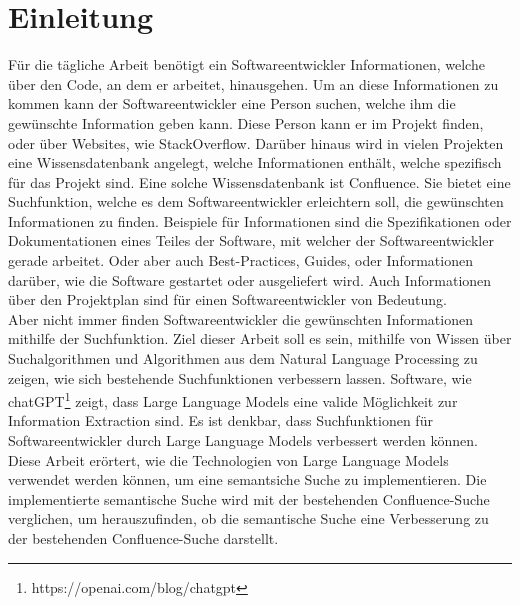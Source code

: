 \chapter{Einleitung}
Für die tägliche Arbeit benötigt ein Softwareentwickler Informationen, welche über den Code, an dem er arbeitet, hinausgehen.
Um an diese Informationen zu kommen kann der Softwareentwickler eine Person suchen, welche ihm die gewünschte Information geben kann.
Diese Person kann er im Projekt finden, oder über Websites, wie StackOverflow.
Darüber hinaus wird in vielen Projekten eine Wissensdatenbank angelegt, welche Informationen enthält, welche spezifisch für das Projekt sind.
Eine solche Wissensdatenbank ist Confluence.
Sie bietet eine Suchfunktion, welche es dem Softwareentwickler erleichtern soll, die gewünschten Informationen zu finden.
Beispiele für Informationen sind die Spezifikationen oder Dokumentationen eines Teiles der Software, mit welcher der Softwareentwickler gerade arbeitet.
Oder aber auch Best-Practices, Guides, oder Informationen darüber, wie die Software gestartet oder ausgeliefert wird.
Auch Informationen über den Projektplan sind für einen Softwareentwickler von Bedeutung.\\

Aber nicht immer finden Softwareentwickler die gewünschten Informationen mithilfe der Suchfunktion.
Ziel dieser Arbeit soll es sein, mithilfe von Wissen über Suchalgorithmen und Algorithmen aus dem Natural Language Processing zu zeigen, wie sich bestehende Suchfunktionen verbessern lassen.
Software, wie chatGPT\footnote{https://openai.com/blog/chatgpt} zeigt, dass Large Language Models eine valide Möglichkeit zur Information Extraction sind.
Es ist denkbar, dass Suchfunktionen für Softwareentwickler durch Large Language Models verbessert werden können.
Diese Arbeit erörtert, wie die Technologien von Large Language Models verwendet werden können, um eine semantsiche Suche zu implementieren.
Die implementierte semantische Suche wird mit der bestehenden Confluence-Suche verglichen, um herauszufinden, ob die semantische Suche eine Verbesserung zu der bestehenden Confluence-Suche darstellt.

